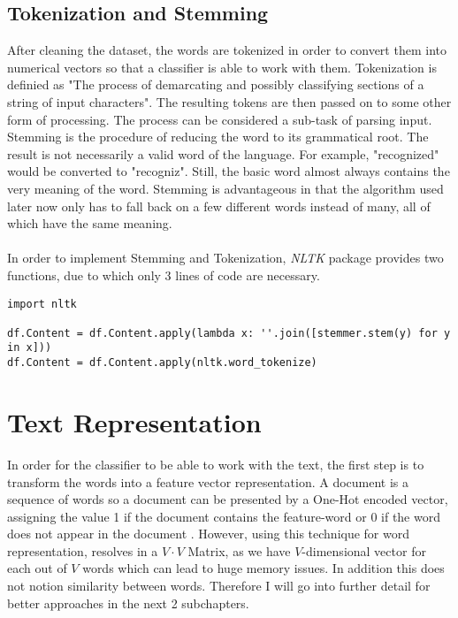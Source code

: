 \documentclass[a4paper, 11pt,titlepage,oneside,openany]{book}
\begin{document}
\subsection{Tokenization and Stemming}
After cleaning the dataset, the words are tokenized in order to convert them into numerical vectors so that a classifier is able to work with them. Tokenization is definied as "The process of demarcating and possibly classifying sections of a string of input characters". The resulting tokens are then passed on to some other form of processing. The process can be considered a sub-task of parsing input.\\
\noindent Stemming is the procedure of reducing the word to its grammatical root. The result is not necessarily a valid word of the language. For example, "recognized" would be converted to "recogniz". Still, the basic word almost always contains the very meaning of the word. Stemming is advantageous in that the algorithm used later now only has to fall back on a few different words instead of many, all of which have the same meaning.\\
\\
\noindent In order to implement Stemming and Tokenization, \textit{NLTK} \cite{nltk} package provides two functions, due to which only 3 lines of code are necessary.
\begin{lstlisting}[caption=Tokenization and Stemming]
import nltk

df.Content = df.Content.apply(lambda x: ''.join([stemmer.stem(y) for y in x]))
df.Content = df.Content.apply(nltk.word_tokenize)
\end{lstlisting}

\section{Text Representation}
In order for the classifier to be able to work with the text, the first step is to transform the words into a feature vector representation. A document is a sequence of words \cite{word2vecdortmund} so a document can be presented by a One-Hot encoded vector, assigning the value 1 if the document contains the feature-word or 0 if the word does not appear in the document \cite{textclassification}. However, using this technique for word representation, resolves in a $V \cdot V$ Matrix, as we have $V$-dimensional vector for each out of $V$ words which can lead to huge memory issues. In addition this does not notion similarity between words. Therefore I will go into further detail for better approaches in the next 2 subchapters.
\end{document}
